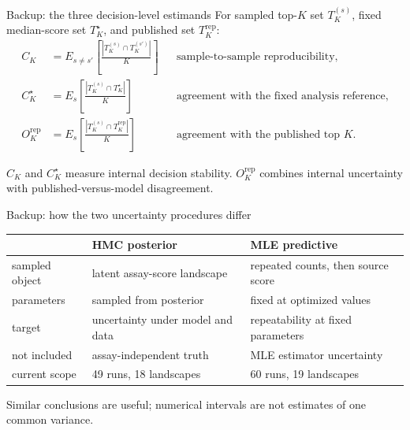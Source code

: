 \documentclass[aspectratio=169,11pt]{beamer}
\begin{document}
\begin{frame}{Backup: the three decision-level estimands}
  For sampled top-$K$ set $T_K^{(s)}$, fixed median-score set $T_K^\star$, and published set $T_K^{\mathrm{rep}}$:
  \begin{align*}
    C_K
      &= E_{s\ne s'}\left[\frac{|T_K^{(s)}\cap T_K^{(s')}|}{K}\right]
      && \text{sample-to-sample reproducibility},\\[0.35em]
    C_K^\star
      &= E_s\left[\frac{|T_K^{(s)}\cap T_K^\star|}{K}\right]
      && \text{agreement with the fixed analysis reference},\\[0.35em]
    O_K^{\mathrm{rep}}
      &= E_s\left[\frac{|T_K^{(s)}\cap T_K^{\mathrm{rep}}|}{K}\right]
      && \text{agreement with the published top }K.
  \end{align*}
  \begin{callout}
    $C_K$ and $C_K^\star$ measure internal decision stability. $O_K^{\mathrm{rep}}$ combines internal uncertainty with published-versus-model disagreement.
  \end{callout}
\end{frame}

\begin{frame}{Backup: how the two uncertainty procedures differ}
  \footnotesize
  \begin{tabular}{p{2.55cm}p{4.25cm}p{4.25cm}}
    \toprule
    & HMC posterior & MLE predictive \\
    \midrule
    sampled object & latent assay-score landscape & repeated counts, then source score \\
    parameters & sampled from posterior & fixed at optimized values \\
    target & uncertainty under model and data & repeatability at fixed parameters \\
    not included & assay-independent truth & MLE estimator uncertainty \\
    current scope & 49 runs, 18 landscapes & 60 runs, 19 landscapes \\
    \bottomrule
  \end{tabular}

  \begin{callout}
    \small Similar conclusions are useful; numerical intervals are not estimates of one common variance.
  \end{callout}
\end{frame}
\end{document}
